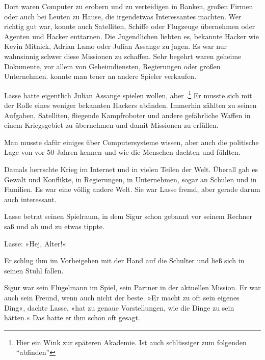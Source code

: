 Dort waren Computer zu erobern und zu verteidigen in Banken, großen Firmen oder auch bei Leuten zu Hause, die irgendetwas Interessantes machten.
Wer richtig gut war, konnte auch Satelliten, Schiffe oder Flugzeuge übernehmen oder Agenten und Hacker enttarnen.
Die Jugendlichen liebten es, bekannte Hacker wie Kevin Mitnick, Adrian Lamo oder Julian Assange zu jagen.
Es war nur wahnsinnig schwer diese Missionen zu schaffen.
Sehr begehrt waren geheime Dokumente, vor allem von Geheimdiensten, Regierungen oder großen Unternehmen.  konnte man teuer an andere Spieler verkaufen.

Lasse hatte eigentlich Julian Assange spielen wollen, aber .\footnote{Hier ein Wink zur späteren Akademie. Ist auch schlüssiger zum folgenden \enquote{abfinden}}
Er musste sich mit der Rolle eines weniger bekannten Hackers abfinden.
Immerhin zählten zu seinen Aufgaben, Satelliten, fliegende Kampfroboter und andere gefährliche Waffen in einem Kriegsgebiet zu übernehmen und damit Missionen zu erfüllen.

Man musste dafür einiges über Computersysteme wissen, aber auch die politische Lage von vor 50 Jahren kennen und wie die Menschen dachten und fühlten.

Damals herrschte Krieg im Internet und in vielen Teilen der Welt.
Überall gab es Gewalt und Konflikte, in Regierungen, in Unternehmen, sogar an Schulen und in Familien.
Es war eine völlig andere Welt.
Sie war Lasse fremd, aber gerade darum auch  interessant.

Lasse betrat seinen Spielraum, in dem Sigur schon gebannt vor seinem Rechner saß und ab und zu etwas tippte.

Lasse: »Hej, Alter!«

Er schlug ihm im Vorbeigehen mit der Hand auf die Schulter und ließ sich in seinen Stuhl fallen.

Sigur war sein Flügelmann im Spiel, sein Partner in der aktuellen Mission. %
Er war auch sein Freund, wenn auch nicht der beste.
»Er macht zu oft sein eigenes Ding«, dachte Lasse, »hat zu genaue Vorstellungen, wie die Dinge zu sein hätten.«
Das hatte er ihm  schon oft gesagt.

